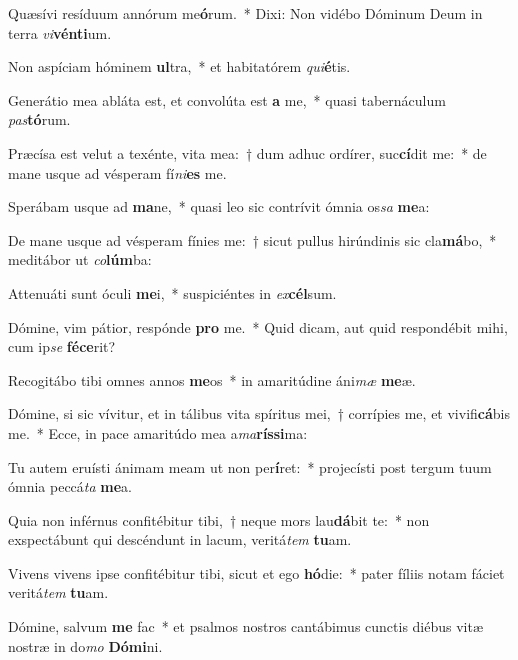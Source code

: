 \item Quæsívi resíduum annórum me\textbf{ó}rum.~* Dixi: Non vidébo Dóminum Deum in terra \textit{vi}\textbf{vén}\textbf{ti}um.
\item Non aspíciam hóminem \textbf{ul}tra,~* et habitatórem \textit{qui}\textbf{é}tis.
\item Generátio mea abláta est, et convolúta est \textbf{a} me,~* quasi tabernáculum \textit{pas}\textbf{tó}rum.
\item Præcísa est velut a texénte, vita mea:~† dum adhuc ordírer, suc\textbf{cí}dit me:~* de mane usque ad vésperam fí\textit{ni}\textbf{es} me.
\item Sperábam usque ad \textbf{ma}ne,~* quasi leo sic contrívit ómnia os\textit{sa} \textbf{me}a:
\item De mane usque ad vésperam fínies me:~† sicut pullus hirúndinis sic cla\textbf{má}bo,~* meditábor ut \textit{co}\textbf{lúm}ba:
\item Attenuáti sunt óculi \textbf{me}i,~* suspiciéntes in \textit{ex}\textbf{cél}sum.
\item Dómine, vim pátior, respónde \textbf{pro} me.~* Quid dicam, aut quid respondébit mihi, cum ip\textit{se} \textbf{fé}\textbf{ce}rit?
\item Recogitábo tibi omnes annos \textbf{me}os~* in amaritúdine áni\textit{mæ} \textbf{me}æ.
\item Dómine, si sic vívitur, et in tálibus vita spíritus mei,~† corrípies me, et vivifi\textbf{cá}bis me.~* Ecce, in pace amaritúdo mea a\textit{ma}\textbf{rís}\textbf{si}ma:
\item Tu autem eruísti ánimam meam ut non per\textbf{í}ret:~* projecísti post tergum tuum ómnia peccá\textit{ta} \textbf{me}a.
\item Quia non inférnus confitébitur tibi,~† neque mors lau\textbf{dá}bit te:~* non exspectábunt qui descéndunt in lacum, veritá\textit{tem} \textbf{tu}am.
\item Vivens vivens ipse confitébitur tibi, sicut et ego \textbf{hó}die:~* pater fíliis notam fáciet veritá\textit{tem} \textbf{tu}am.
\item Dómine, salvum \textbf{me} fac~* et psalmos nostros cantábimus cunctis diébus vitæ nostræ in do\textit{mo} \textbf{Dó}\textbf{mi}ni.
